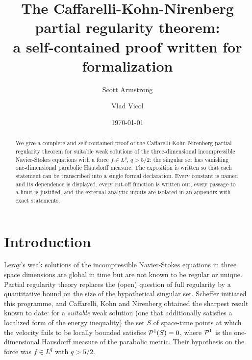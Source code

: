 \documentclass[11pt,reqno]{amsart}
\title[The Caffarelli-Kohn-Nirenberg theorem]
      {The Caffarelli-Kohn-Nirenberg partial regularity theorem:\\
       a self-contained proof written for formalization}
\author{Scott Armstrong}
\author{Vlad Vicol}
\date{\today}
\begin{document}
\begin{abstract}
We give a complete and self-contained proof of the Caffarelli-Kohn-Nirenberg
partial regularity theorem for suitable weak solutions of the three-dimensional
incompressible Navier-Stokes equations with a force $f\in L^q$, $q>5/2$: the
singular set has vanishing one-dimensional parabolic Hausdorff measure. The
exposition is written so that each statement can be transcribed into a single
formal declaration. Every constant is named and its dependence is displayed,
every cut-off function is written out, every passage to a limit is justified,
and the external analytic inputs are isolated in an appendix with exact
statements.
\end{abstract}

\maketitle

\setcounter{tocdepth}{1}
\tableofcontents

\section*{Introduction}

Leray's weak solutions of the incompressible Navier-Stokes equations in three
space dimensions are global in time but are not known to be regular or unique.
Partial regularity theory replaces the (open) question of full regularity by a
quantitative bound on the size of the hypothetical singular set. Scheffer
\cite{Scheffer1977} initiated this programme, and Caffarelli, Kohn and Nirenberg
\cite{CKN1982} obtained the sharpest result known to date: for a
\emph{suitable} weak solution (one that additionally satisfies a localized
form of the energy inequality) the set $S$ of space-time points at which the
velocity fails to be locally bounded satisfies $\mathcal{P}^{1}(S)=0$, where
$\mathcal{P}^{1}$ is the one-dimensional Hausdorff measure of the parabolic metric.
Their hypothesis on the force was $f\in L^{q}$ with $q>5/2$.
\end{document}
